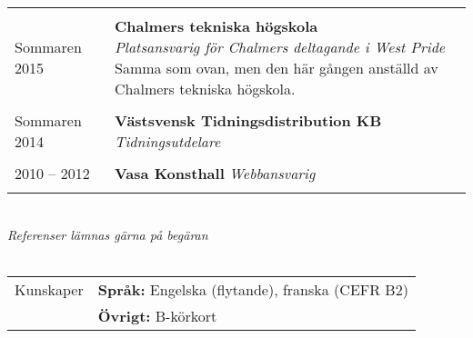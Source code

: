 \documentclass[letterpaper,11pt,oneside]{article}
\begin{document}
\begin{tabular}{@{} l l}
    & \\
                                Sommaren 2015 & \parbox{5.0in}{\textbf{Chalmers tekniska högskola} \\
                                \textit{Platsansvarig för Chalmers deltagande i West Pride} \\
                                Samma som ovan, men den här gången anställd av Chalmers tekniska högskola.} \\
    & \\
                                Sommaren 2014 & \textbf{Västsvensk Tidningsdistribution KB} \textit{Tidningsutdelare} \\
    & \\
                                2010 – 2012 & \textbf{Vasa Konsthall} \textit{Webbansvarig} \\
    & \\


\end{tabular}

\\ \newline
\textit{Referenser lämnas gärna på begäran}
\\
\\

\noindent \begin{tabular}{@{} l l}
    \Large{Kunskaper} & \textbf{Språk:} Engelska (flytande), franska (CEFR B2) \\
                      & \textbf{Övrigt:} B-körkort
 \end{tabular}
\newpage


\end{document}
